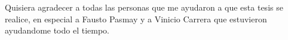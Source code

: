 

\begin{acknowledgements}      %


Quisiera agradecer a todas las personas que me ayudaron a que esta tesis se realice, en especial a Fausto Pasmay y a Vinicio Carrera que estuvieron ayudandome todo el tiempo.


\end{acknowledgements}


